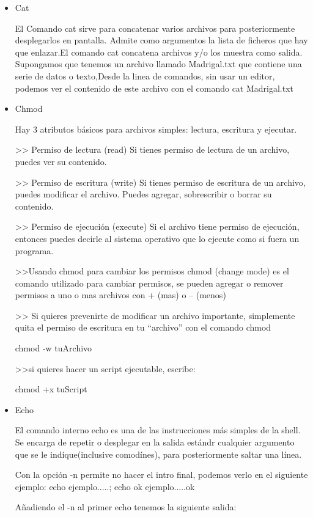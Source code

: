 \documentclass{article}
\begin{document}
\begin{itemize}
\item{Cat}

El Comando cat sirve para concatenar varios archivos para posteriormente desplegarlos en pantalla. Admite como argumentos la lista de ficheros que hay que enlazar.El comando cat concatena archivos y/o los muestra como salida. Supongamos que tenemos un archivo llamado Madrigal.txt que contiene una serie de datos o texto,Desde la linea de comandos, sin usar un editor, podemos ver el contenido de este archivo con el comando cat Madrigal.txt

\item{Chmod}

Hay 3 atributos básicos para archivos simples: lectura, escritura y ejecutar.

>> Permiso de lectura (read)
Si tienes permiso de lectura de un archivo, puedes ver su contenido.

>> Permiso de escritura (write)
Si tienes permiso de escritura de un archivo, puedes modificar el archivo. Puedes agregar, sobrescribir o borrar su contenido.

>> Permiso de ejecución (execute)
Si el archivo tiene permiso de ejecución, entonces puedes decirle al sistema operativo que lo ejecute como si fuera un programa.

>>Usando chmod para cambiar los permisos
chmod (change mode) es el comando utilizado para cambiar permisos, se pueden agregar o remover permisos a uno o mas archivos con + (mas) o – (menos)

>> Si quieres prevenirte de modificar un archivo importante, simplemente quita el permiso de escritura en tu “archivo” con el comando chmod

chmod -w tuArchivo

>>si quieres hacer un script ejecutable, escribe:

chmod +x tuScript

\item{Echo}

El comando interno echo es una de las instrucciones más simples de la shell. Se encarga de repetir o desplegar en la salida estándr cualquier argumento que se le indíque(inclusive comodínes), para posteriormente saltar una línea.

Con la opción -n permite no hacer el intro final, podemos verlo en el siguiente ejemplo: echo ejemplo.....; echo ok ejemplo.....ok

Añadiendo el -n al primer echo tenemos la siguiente salida:



\end{itemize}
\end{document}
